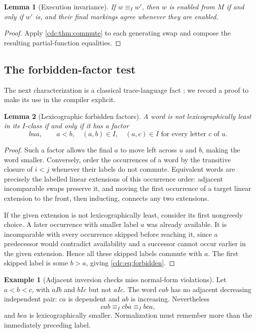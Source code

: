 \documentclass[11pt,a4paper]{article}
\newtheorem{lemma}[lemma]{Lemma}
\theoremstyle{definition}
\newtheorem{example}[example]{Example}
\theoremstyle{remark}
\begin{document}
\begin{lemma}[Execution invariance]\label{cdc:lem:invariance}
If $w\equiv_I w'$, then $w$ is enabled from $M$ if and only if $w'$ is, and their final markings agree whenever they are enabled.
\end{lemma}
\begin{proof}
Apply \cref{cdc:thm:commute} to each generating swap and compose the resulting partial-function equalities.
\end{proof}

\subsection{The forbidden-factor test}
The next characterization is a classical trace-language fact \cite{barthelemy}; we record a proof to make its use in the compiler explicit.

\begin{lemma}[Lexicographic forbidden factors]\label{cdc:lem:forbidden}
A word is not lexicographically least in its $I$-class if and only if it has a factor
\begin{equation}\label{cdc:eq:forbidden}
bua,\qquad a<b,\quad(a,b)\in I,\quad
(a,c)\in I\text{ for every letter }c\text{ of }u.
\end{equation}
\end{lemma}
\begin{proof}
Such a factor allows the final $a$ to move left across $u$ and $b$, making the word smaller. Conversely, order the occurrences of a word by the transitive closure of $i<j$ whenever their labels do not commute. Equivalent words are precisely the labelled linear extensions of this occurrence order: adjacent incomparable swaps preserve it, and moving the first occurrence of a target linear extension to the front, then inducting, connects any two extensions.

If the given extension is not lexicographically least, consider its first nongreedy choice. A later occurrence with smaller label $a$ was already available. It is incomparable with every occurrence skipped before reaching it, since a predecessor would contradict availability and a successor cannot occur earlier in the given extension. Hence all these skipped labels commute with $a$. The first skipped label is some $b>a$, giving \eqref{cdc:eq:forbidden}.
\end{proof}

\begin{example}[Adjacent inversion checks miss normal-form violations]\label{cdc:ex:adjacent}
Let $a<b<c$, with $aIb$ and $bIc$ but not $aIc$. The word $cab$ has no adjacent decreasing independent pair: $ca$ is dependent and $ab$ is increasing. Nevertheless
\[
cab\equiv_I cba\equiv_I bca,
\]
and $bca$ is lexicographically smaller. Normalization must remember more than the immediately preceding label.
\end{example}
\end{document}
